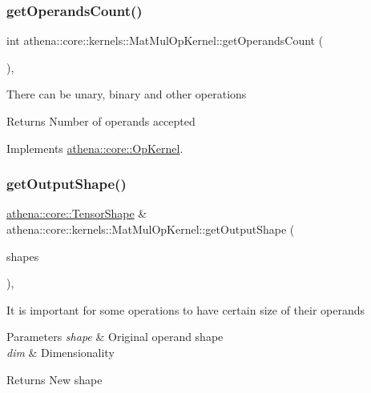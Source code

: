 \subsubsection{\texorpdfstring{get\+Operands\+Count()}{getOperandsCount()}}
{\footnotesize\ttfamily int athena\+::core\+::kernels\+::\+Mat\+Mul\+Op\+Kernel\+::get\+Operands\+Count (\begin{DoxyParamCaption}{ }\end{DoxyParamCaption})\hspace{0.3cm}{\ttfamily [override]}, {\ttfamily [virtual]}}

There can be unary, binary and other operations \begin{DoxyReturn}{Returns}
Number of operands accepted 
\end{DoxyReturn}


Implements \mbox{\hyperlink{classathena_1_1core_1_1_op_kernel_add97d4c132d80ecd9915acfedf7c9119}{athena\+::core\+::\+Op\+Kernel}}.

\mbox{\label{classathena_1_1core_1_1kernels_1_1_mat_mul_op_kernel_a6bfb45669c7ebb74c32f8846a940c57a}} 
\subsubsection{\texorpdfstring{get\+Output\+Shape()}{getOutputShape()}}
{\footnotesize\ttfamily \mbox{\hyperlink{classathena_1_1core_1_1_tensor_shape}{athena\+::core\+::\+Tensor\+Shape}} \& athena\+::core\+::kernels\+::\+Mat\+Mul\+Op\+Kernel\+::get\+Output\+Shape (\begin{DoxyParamCaption}\item[{const std\+::vector$<$ \mbox{\hyperlink{classathena_1_1core_1_1_tensor_shape}{athena\+::core\+::\+Tensor\+Shape}} \& $>$ \&}]{shapes }\end{DoxyParamCaption})\hspace{0.3cm}{\ttfamily [override]}, {\ttfamily [virtual]}}

It is important for some operations to have certain size of their operands 
\begin{DoxyParams}{Parameters}
{\em shape} & Original operand shape \\
\hline
{\em dim} & Dimensionality \\
\hline
\end{DoxyParams}
\begin{DoxyReturn}{Returns}
New shape 
\end{DoxyReturn}


